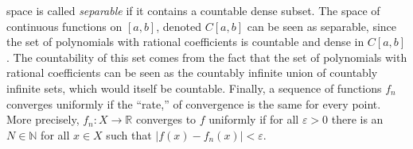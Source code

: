 \documentclass[crop=false,class=article,oneside]{standalone}
\begin{document}
            space is called \textit{separable} if it contains
            a countable dense subset. The space of continuous
            functions on $[a,b]$, denoted $C[a,b]$ can be seen
            as separable, since the set of polynomials with
            rational coefficients is countable and dense in
            $C[a,b]$. The countability of this set comes from
            the fact that the set of polynomials with rational
            coefficients can be seen as the countably infinite
            union of countably infinite sets, which would itself
            be countable. Finally, a sequence of functions
            $f_{n}$ converges uniformly if the ``rate,'' of
            convergence is the same for every point. More precisely,
            $f_{n}:X\rightarrow\mathbb{R}$ converges to $f$
            uniformly if for all $\varepsilon>0$ there is an
            $N\in\mathbb{N}$ for all $x\in{X}$ such that
            $|f(x)-f_{n}(x)|<\varepsilon$.
\end{document}
